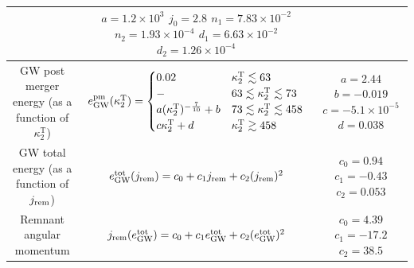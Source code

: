 \documentclass[aps,prl,onecolumn,superscriptaddress,groupedaddress,nofootinbib,floatfix,notitlepage]{revtex4-1}
\newcommand{\stext}[1]{\text{#1}}
\newcommand{\tento}[1]{\times 10^{#1}}
\begin{document}
\begin{table}[t]
\begin{tabular}{ccc}
     & \makecell{$ a = 1.2 \tento{3}$ \\ $j_0 = 2.8$ \\ $ n_1 = 7.83\tento{-2}$ \\ $n_2 =  1.93\tento{-4}  $ 
     \\ $d_1 = 6.63 \tento{-2}$ \\ $d_2 = 1.26 \tento{-4}$} \\
     \hline
     \makecell{GW post merger energy \\ (as a function of $\kappa^\text{T}_2$)}& 
     $e^{\rm pm}_{\rm GW}( \kappa^\text{T}_2 ) = \begin{cases}  0.02  & \kappa^\text{T}_2 \lesssim 63 \\ - & 63 \lesssim  \kappa_2^\stext{T} \lesssim 73\\ a(\kappa^\text{T}_2)^{-\frac{7}{10}} + b & 73\lesssim \kappa^\text{T}_2 \lesssim 458 \\  c \kappa^\text{T}_2 +d  & \kappa^\text{T}_2 \gtrsim 458 \end{cases} $
      & \makecell{$ a = 2.44 $ \\ $ b = -0.019 $\\ $ c =-5.1\times 10^{-5} $\\ $ d = 0.038$}\\
      \hline
      \makecell{GW total energy \\ (as a function of $j_{\rm rem}$)} & 
      $ e^{\rm tot}_{\rm GW}(j_{\rm rem}) = c_0 + c_1 j_{\rm rem} + c_2 (j_{\rm rem})^2$ &
      \makecell{$ c_0 = 0.94 $ \\ $c_1 = -0.43 $ \\ $c_2 = 0.053$}
	  \\      
      \hline
      Remnant angular momentum &
      $ j_{\rm rem}(e^{\rm tot}_{\rm GW}) = c_0 + c_1 e^{\rm tot}_{\rm GW} + c_2 (e^{\rm tot}_{\rm GW})^2 $ & 
      \makecell{$ c_0 = 4.39 $ \\ $c_1 = -17.2 $ \\ $c_2 = 38.5 $} \\
     \hline
   \end{tabular}
  \label{tab:fit}
 \end{table}
\end{document}
